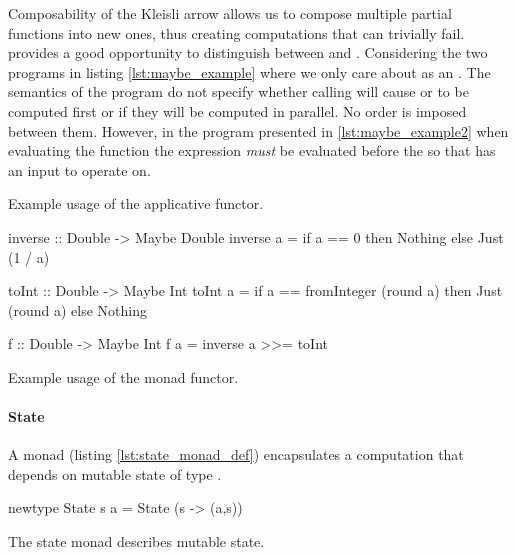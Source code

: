  Composability of the Kleisli arrow allows us to compose multiple
  partial functions into new ones, thus creating computations that can
  trivially fail.  provides a good opportunity to
  distinguish between  and . Considering
  the two programs in listing \ref{lst:maybe_example} where we only
  care about  as an . The semantics of
  the program do not specify whether calling  will cause
   or  to be computed first or if they
  will be computed in parallel. No order is imposed between
  them. However, in the program presented in \ref{lst:maybe_example2}
  when evaluating the function  the expression  \emph{must} be evaluated before the  so that
   has an input to operate on.

  \begin{code}
    \caption{\label{lst:maybe_example}Example usage of the 
      applicative functor.}
  \end{code}

  \begin{code}
\begin{haskellcode}
inverse :: Double -> Maybe Double
inverse a = if a == 0 then Nothing else Just (1 / a)

toInt :: Double -> Maybe Int
toInt a =
  if a == fromInteger (round a)
    then Just (round a)
    else Nothing

f :: Double -> Maybe Int
f a = inverse a >>= toInt
\end{haskellcode}
    \caption{\label{lst:maybe_example2}Example usage of the  monad functor.}
  \end{code}

  \paragraph{State}

  A  monad (listing \ref{lst:state_monad_def}) encapsulates
  a computation that depends on mutable state of type .

  \begin{code}
\begin{haskellcode}
newtype State s a = State (s -> (a,s))
\end{haskellcode}

    \caption{\label{lst:state_monad_def}The state monad describes
      mutable state.}
  \end{code}

